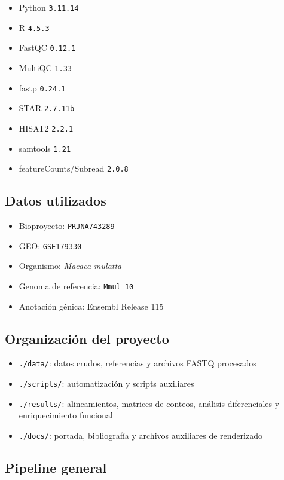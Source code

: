 \documentclass[
  12pt,
  letterpaper,
  DIV=11,
  numbers=noendperiod]{scrartcl}
\providecommand{\tightlist}{%
  \setlength{\itemsep}{0pt}\setlength{\parskip}{0pt}}
\begin{document}
\begin{itemize}
\tightlist
\item
  Python \texttt{3.11.14}
\item
  R \texttt{4.5.3}
\item
  FastQC \texttt{0.12.1}
\item
  MultiQC \texttt{1.33}
\item
  fastp \texttt{0.24.1}
\item
  STAR \texttt{2.7.11b}
\item
  HISAT2 \texttt{2.2.1}
\item
  samtools \texttt{1.21}
\item
  featureCounts/Subread \texttt{2.0.8}
\end{itemize}

\subsection{Datos utilizados}\label{datos-utilizados}

\begin{itemize}
\tightlist
\item
  Bioproyecto: \texttt{PRJNA743289}
\item
  GEO: \texttt{GSE179330}
\item
  Organismo: \emph{Macaca mulatta}
\item
  Genoma de referencia: \texttt{Mmul\_10}
\item
  Anotación génica: Ensembl Release 115
\end{itemize}

\subsection{Organización del
proyecto}\label{organizaciuxf3n-del-proyecto}

\begin{itemize}
\tightlist
\item
  \texttt{./data/}: datos crudos, referencias y archivos FASTQ
  procesados
\item
  \texttt{./scripts/}: automatización y scripts auxiliares
\item
  \texttt{./results/}: alineamientos, matrices de conteos, análisis
  diferenciales y enriquecimiento funcional
\item
  \texttt{./docs/}: portada, bibliografía y archivos auxiliares de
  renderizado
\end{itemize}

\subsection{Pipeline general}\label{pipeline-general}
\end{document}
